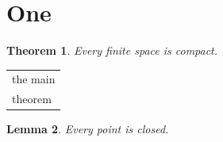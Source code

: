 \documentclass{article}
\newtheorem{theorem}{Theorem}[section]
\newtheorem{lemma}[theorem]{Lemma}
\begin{document}
\section{One}
\begin{theorem} Every finite space is compact. \end{theorem}
\begin{tabular}{l}
the main\\theorem
\end{tabular}

\begin{lemma} Every point is closed. \end{lemma}
\end{document}
